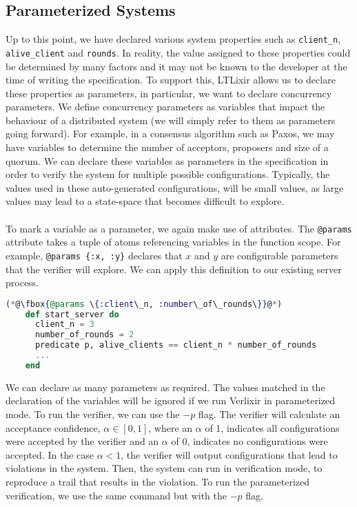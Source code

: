 \subsection{Parameterized Systems}
Up to this point, we have declared various system properties such as \texttt{client\_n}, \texttt{alive\_client} and \texttt{rounds}. In reality, the value assigned to these properties could be determined by many factors and it may not be known to the developer at the time of writing the specification. To support this, LTLixir allows us to declare these properties as parameters, in particular, we want to declare concurrency parameters. We define concurrency parameters as variables that impact the behaviour of a distributed system (we will simply refer to them as parameters going forward). For example, in a consensus algorithm such as Paxos, we may have variables to determine the number of acceptors, proposers and size of a quorum. We can declare these variables as parameters in the specification in order to verify the system for multiple possible configurations. Typically, the values used in these auto-generated configurations, will be small values, as large values may lead to a state-space that becomes difficult to explore.
\\ \\
To mark a variable as a parameter, we again make use of attributes. The \texttt{@params} attribute takes a tuple of atoms referencing variables in the function scope. For example, \texttt{@params \{:x, :y\}} declares that $x$ and $y$ are configurable parameters that the verifier will explore. We can apply this definition to our existing server process.
\begin{lstlisting}[language=Elixir, xleftmargin=.3\linewidth, caption={Example of declaring concurrency parameters in specification.}]
    (*@\fbox{@params \{:client\_n, :number\_of\_rounds\}}@*)
    def start_server do
      client_n = 3
      number_of_rounds = 2
      predicate p, alive_clients == client_n * number_of_rounds
      ...
    end
\end{lstlisting}
We can declare as many parameters as required. The values matched in the declaration of the variables will be ignored if we run Verlixir in parameterized mode. To run the verifier, we can use the $-p$ flag. The verifier will calculate an acceptance confidence, \(\alpha \in [0, 1]\), where an $\alpha$ of 1, indicates all configurations were accepted by the verifier and an $\alpha$ of 0, indicates no configurations were accepted. In the case $\alpha < 1$, the verifier will output configurations that lead to violations in the system. Then, the system can run in verification mode, to reproduce a trail that results in the violation. To run the parameterized verification, we use the same command but with the $-p$ flag.
